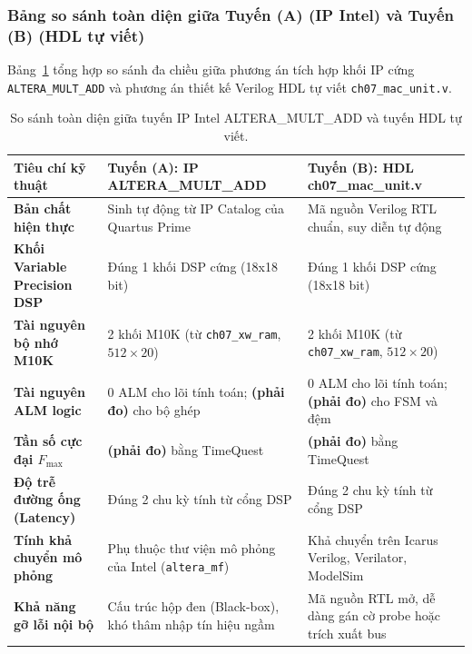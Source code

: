 \subsubsection*{Bảng so sánh toàn diện giữa Tuyến (A) (IP Intel) và Tuyến (B) (HDL tự viết)}
Bảng~\ref{tab:ch07_ip_vs_hdl} tổng hợp so sánh đa chiều giữa phương án tích hợp khối IP cứng \texttt{ALTERA\_MULT\_ADD} và phương án thiết kế Verilog HDL tự viết \texttt{ch07\_mac\_unit.v}.

\begin{table}[htbp]
\centering
\small
\caption{So sánh toàn diện giữa tuyến IP Intel ALTERA\_MULT\_ADD và tuyến HDL tự viết.}
\label{tab:ch07_ip_vs_hdl}
\begin{tabularx}{\textwidth}{p{3.8cm} p{4.6cm} X}
\toprule
\textbf{Tiêu chí kỹ thuật} & \textbf{Tuyến (A): IP ALTERA\_MULT\_ADD} & \textbf{Tuyến (B): HDL ch07\_mac\_unit.v} \\
\midrule
\textbf{Bản chất hiện thực} & Sinh tự động từ IP Catalog của Quartus Prime & Mã nguồn Verilog RTL chuẩn, suy diễn tự động \\
\addlinespace[3pt]
\textbf{Khối Variable Precision DSP} & Đúng 1 khối DSP cứng (18x18 bit) & Đúng 1 khối DSP cứng (18x18 bit) \\
\addlinespace[3pt]
\textbf{Tài nguyên bộ nhớ M10K} & 2 khối M10K (từ \texttt{ch07\_xw\_ram}, $512 \times 20$) & 2 khối M10K (từ \texttt{ch07\_xw\_ram}, $512 \times 20$) \\
\addlinespace[3pt]
\textbf{Tài nguyên ALM logic} & 0 ALM cho lõi tính toán; \textbf{(phải đo)} cho bộ ghép & 0 ALM cho lõi tính toán; \textbf{(phải đo)} cho FSM và đệm \\
\addlinespace[3pt]
\textbf{Tần số cực đại $F_{\max}$} & \textbf{(phải đo)} bằng TimeQuest & \textbf{(phải đo)} bằng TimeQuest \\
\addlinespace[3pt]
\textbf{Độ trễ đường ống (Latency)} & Đúng 2 chu kỳ tính từ cổng DSP & Đúng 2 chu kỳ tính từ cổng DSP \\
\addlinespace[3pt]
\textbf{Tính khả chuyển mô phỏng} & Phụ thuộc thư viện mô phỏng của Intel (\texttt{altera\_mf}) & Khả chuyển trên Icarus Verilog, Verilator, ModelSim \\
\addlinespace[3pt]
\textbf{Khả năng gỡ lỗi nội bộ} & Cấu trúc hộp đen (Black-box), khó thâm nhập tín hiệu ngầm & Mã nguồn RTL mở, dễ dàng gán cờ probe hoặc trích xuất bus \\
\bottomrule
\end{tabularx}
\end{table}

